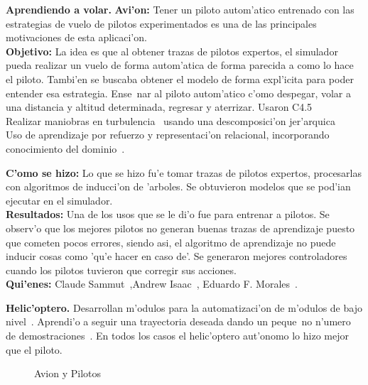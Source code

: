 \documentclass[11pt]{article}
\begin{document}
\textbf{Aprendiendo a volar.} \textbf{Avi'on:} Tener un piloto autom'atico entrenado con las estrategias de vuelo de pilotos experimentados es una de las principales motivaciones de esta aplicaci'on.\\
\textbf{Objetivo:} La idea es que al obtener trazas de pilotos expertos, el simulador pueda realizar un vuelo de forma autom'atica de forma parecida a como lo hace el piloto. Tambi'en se buscaba obtener el modelo de forma expl'icita para poder entender esa estrategia. Ense~nar al piloto autom'atico c'omo despegar, volar a una distancia y altitud determinada, regresar y aterrizar. Usaron C4.5~\cite{Sammut92learningto}\\
Realizar maniobras en turbulencia~\cite{Isaac03goal-directedlearning} usando una descomposici'on jer'arquica\\
Uso de aprendizaje por refuerzo y representaci'on relacional, incorporando conocimiento del dominio~\cite{Morales04learningto}.

\textbf{C'omo se hizo:} Lo que se hizo fu'e tomar trazas de pilotos expertos, procesarlas con algoritmos de inducci'on de 'arboles. Se obtuvieron modelos que se pod'ian ejecutar en el simulador. \\
\textbf{Resultados:} Una de los usos que se le di'o fue para entrenar a pilotos. Se observ'o que los mejores pilotos no generan buenas trazas de aprendizaje puesto que cometen pocos errores, siendo asi, el algoritmo de aprendizaje no puede inducir cosas como 'qu'e hacer en caso de'. Se generaron mejores controladores cuando los pilotos tuvieron que corregir sus acciones.\\
\textbf{Qui'enes:} Claude Sammut~\cite{Sammut92learningto},Andrew Isaac~\cite{Isaac03goal-directedlearning}, Eduardo F. Morales~\cite{Morales04learningto}.

\textbf{Helic'optero.} Desarrollan m'odulos para la automatizaci'on de m'odulos de bajo nivel~\cite{Buskey03c}. Aprendi'o a seguir una trayectoria deseada dando un peque~no n'umero de demostraciones~\cite{heliCoates}. En todos los casos el helic'optero aut'onomo lo hizo mejor que el piloto.

\begin{figure}[h]
\begin{center}

\caption{Avion y Pilotos}
  \label{fig:volar}
\end{center}
\end{figure} 
\end{document}
